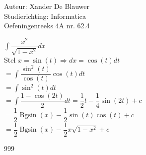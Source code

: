 \documentclass[a4paper]{article}
\begin{document}
\noindent \large Auteur: Xander De Blauwer \\
\noindent \large Studierichting: Informatica\\
\noindent \large Oefeningenreeks 4A nr. 62.4\\

\medskip

\normalsize

$\displaystyle\int \dfrac{x^2}{\sqrt{1-x^2}}dx $ \\

Stel $x = \sin(t) \Rightarrow dx = \cos(t)dt$ \\

$= \displaystyle\int \dfrac{\sin^2(t)}{\cos(t)}\cos(t)dt $ \\

$ = \displaystyle\int\sin^2(t)dt $ \\

$ = \displaystyle\int \dfrac{1-\cos(2t)}{2}dt = \dfrac{1}{2}t - \dfrac{1}{4}\sin(2t) + c $ \\

$ = \dfrac{1}{2}\operatorname{Bgsin}(x) - \dfrac{1}{2}\sin(t)\cos(t) + c $ \\

$ = \dfrac{1}{2}\operatorname{Bgsin}(x) - \dfrac{1}{2}x\sqrt{1-x^2} + c$






\begin{thebibliography}{999}
\end{thebibliography}
\end{document}
